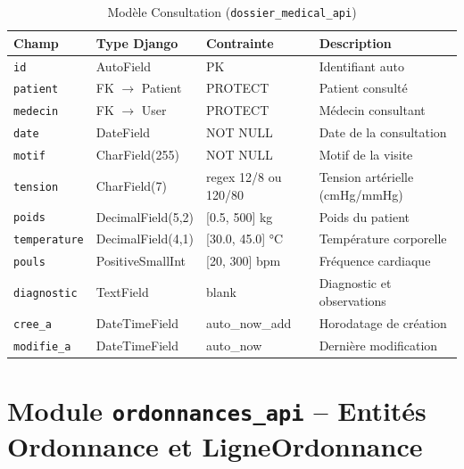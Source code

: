 \documentclass[12pt,a4paper]{report}
\begin{document}
\begin{table}[H]
\centering
\caption{Modèle Consultation (\texttt{dossier\_medical\_api})}
\renewcommand{\arraystretch}{1.4}
\begin{tabular}{|p{3.5cm}|p{3.5cm}|p{3cm}|p{4cm}|}
  \hline
  \rowcolor{medaccent}
  \textbf{Champ} & \textbf{Type Django} & \textbf{Contrainte} & \textbf{Description} \\
  \hline
  \texttt{id} & AutoField & PK & Identifiant auto \\
  \hline
  \texttt{patient} & FK $\rightarrow$ Patient & PROTECT & Patient consulté \\
  \hline
  \texttt{medecin} & FK $\rightarrow$ User & PROTECT & Médecin consultant \\
  \hline
  \texttt{date} & DateField & NOT NULL & Date de la consultation \\
  \hline
  \texttt{motif} & CharField(255) & NOT NULL & Motif de la visite \\
  \hline
  \texttt{tension} & CharField(7) & regex 12/8 ou 120/80 & Tension artérielle (cmHg/mmHg) \\
  \hline
  \texttt{poids} & DecimalField(5,2) & [0.5, 500] kg & Poids du patient \\
  \hline
  \texttt{temperature} & DecimalField(4,1) & [30.0, 45.0] °C & Température corporelle \\
  \hline
  \texttt{pouls} & PositiveSmallInt & [20, 300] bpm & Fréquence cardiaque \\
  \hline
  \texttt{diagnostic} & TextField & blank & Diagnostic et observations \\
  \hline
  \texttt{cree\_a} & DateTimeField & auto\_now\_add & Horodatage de création \\
  \hline
  \texttt{modifie\_a} & DateTimeField & auto\_now & Dernière modification \\
  \hline
\end{tabular}
\end{table}

\section{Module \texttt{ordonnances\_api} -- Entités Ordonnance et LigneOrdonnance}
\end{document}
